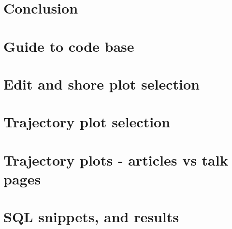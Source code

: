 \documentclass[a4paper,11pt,twoside]{report}
\begin{document}
\chapter{Conclusion}
\label{ch:conclusions}




\appendix

\begin{appendices}
\chapter{Guide to code base}

\chapter{Edit and shore plot selection}
\label{sec:edit-share}

\chapter{Trajectory plot selection}

\chapter{Trajectory plots - articles vs talk pages}

\chapter{SQL snippets, and results}

\end{appendices}

{}
\printbibliography        
\end{document}
